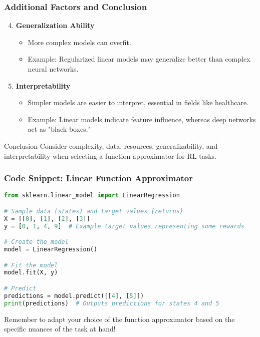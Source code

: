 \documentclass[aspectratio=169]{beamer}
\begin{document}
\begin{frame}
    \frametitle{Additional Factors and Conclusion}
    \begin{enumerate}
        \setcounter{enumi}{3}
        \item \textbf{Generalization Ability}
            \begin{itemize}
                \item More complex models can overfit.
                \item Example: Regularized linear models may generalize better than complex neural networks.
            \end{itemize}
        \item \textbf{Interpretability}
            \begin{itemize}
                \item Simpler models are easier to interpret, essential in fields like healthcare.
                \item Example: Linear models indicate feature influence, whereas deep networks act as "black boxes."
            \end{itemize}
    \end{enumerate}

    \begin{block}{Conclusion}
        Consider complexity, data, resources, generalizability, and interpretability when selecting a function approximator for RL tasks.
    \end{block}
\end{frame}

\begin{frame}[fragile]
    \frametitle{Code Snippet: Linear Function Approximator}
    \begin{lstlisting}[language=Python]
from sklearn.linear_model import LinearRegression

# Sample data (states) and target values (returns)
X = [[0], [1], [2], [3]]
y = [0, 1, 4, 9]  # Example target values representing some rewards

# Create the model
model = LinearRegression()

# Fit the model
model.fit(X, y)

# Predict
predictions = model.predict([[4], [5]])
print(predictions)  # Outputs predictions for states 4 and 5
    \end{lstlisting}
    Remember to adapt your choice of the function approximator based on the specific nuances of the task at hand!
\end{frame}
\end{document}
